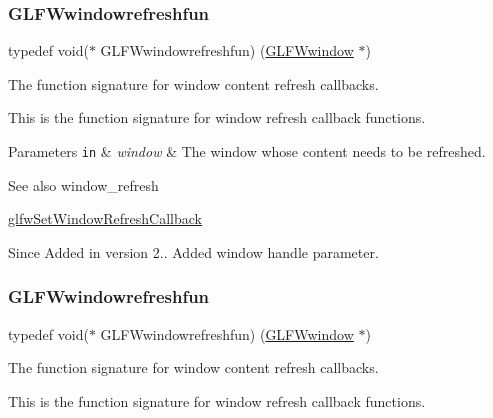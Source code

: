 \subsubsection{\texorpdfstring{G\+L\+F\+Wwindowrefreshfun}{GLFWwindowrefreshfun}\hspace{0.1cm}{\footnotesize\ttfamily [2/5]}}
{\footnotesize\ttfamily typedef void($\ast$  G\+L\+F\+Wwindowrefreshfun) (\hyperlink{group__window_ga3c96d80d363e67d13a41b5d1821f3242}{G\+L\+F\+Wwindow} $\ast$)}



The function signature for window content refresh callbacks. 

This is the function signature for window refresh callback functions.


\begin{DoxyParams}[1]{Parameters}
\mbox{\tt in}  & {\em window} & The window whose content needs to be refreshed.\\
\hline
\end{DoxyParams}
\begin{DoxySeeAlso}{See also}
window\+\_\+refresh 

\hyperlink{group__window_ga9d2621fbc271a0cdc0ce91f9749f46e3}{glfw\+Set\+Window\+Refresh\+Callback}
\end{DoxySeeAlso}
\begin{DoxySince}{Since}
Added in version 2..  Added window handle parameter. 
\end{DoxySince}
\mbox{\label{group__window_ga7a56f9e0227e2cd9470d80d919032e08}} 
\subsubsection{\texorpdfstring{G\+L\+F\+Wwindowrefreshfun}{GLFWwindowrefreshfun}\hspace{0.1cm}{\footnotesize\ttfamily [3/5]}}
{\footnotesize\ttfamily typedef void($\ast$  G\+L\+F\+Wwindowrefreshfun) (\hyperlink{group__window_ga3c96d80d363e67d13a41b5d1821f3242}{G\+L\+F\+Wwindow} $\ast$)}



The function signature for window content refresh callbacks. 

This is the function signature for window refresh callback functions.


